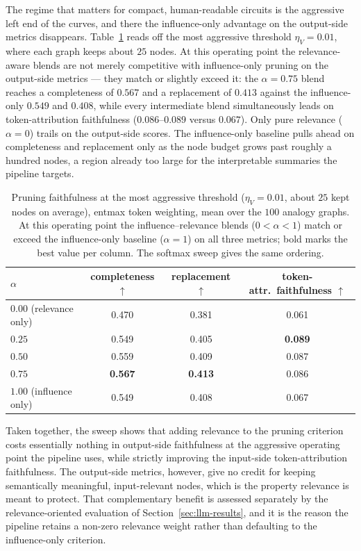 \documentclass[../main.tex]{subfiles}
\begin{document}
The regime that matters for compact, human-readable circuits is the aggressive left
end of the curves, and there the influence-only advantage on the output-side
metrics disappears. Table~\ref{tab:prune-alpha-aggressive} reads off the most
aggressive threshold $\eta_V = 0.01$, where each graph keeps about $25$ nodes. At
this operating point the relevance-aware blends are not merely competitive with
influence-only pruning on the output-side metrics --- they match or slightly exceed
it: the $\alpha = 0.75$ blend reaches a completeness of $0.567$ and a replacement of
$0.413$ against the influence-only $0.549$ and $0.408$, while every intermediate
blend simultaneously leads on token-attribution faithfulness ($0.086$--$0.089$
versus $0.067$). Only pure relevance ($\alpha = 0$) trails on the output-side
scores. The
influence-only baseline pulls ahead on completeness and replacement only as the node
budget grows past roughly a hundred nodes, a region already too large for the
interpretable summaries the pipeline targets.

\begin{table}[h]
\centering
\small
\caption{Pruning faithfulness at the most aggressive threshold
($\eta_V = 0.01$, about $25$ kept nodes on average), entmax token weighting, mean
over the $100$ analogy graphs. At this operating point the influence--relevance
blends ($0 < \alpha < 1$) match or exceed the influence-only baseline
($\alpha = 1$) on all three metrics; bold marks the best value per column. The
softmax sweep gives the same ordering.}
\label{tab:prune-alpha-aggressive}
\begin{tabular}{l c c c}
\toprule
$\alpha$ & completeness $\uparrow$ & replacement $\uparrow$ & token-attr.\ faithfulness $\uparrow$ \\
\midrule
$0.00$ (relevance only) & 0.470 & 0.381 & 0.061 \\
$0.25$                  & 0.549 & 0.405 & \textbf{0.089} \\
$0.50$                  & 0.559 & 0.409 & 0.087 \\
$0.75$                  & \textbf{0.567} & \textbf{0.413} & 0.086 \\
$1.00$ (influence only) & 0.549 & 0.408 & 0.067 \\
\bottomrule
\end{tabular}
\end{table}

Taken together, the sweep shows that adding relevance to the pruning criterion costs
essentially nothing in output-side faithfulness at the aggressive operating point
the pipeline uses, while strictly improving the input-side token-attribution
faithfulness. The output-side metrics, however, give no credit for keeping
semantically meaningful, input-relevant nodes, which is the property relevance is
meant to protect. That complementary benefit is assessed separately by the
relevance-oriented evaluation of Section~\ref{sec:llm-results}, and it is the reason
the pipeline retains a non-zero relevance weight rather than defaulting to the
influence-only criterion.
\end{document}

